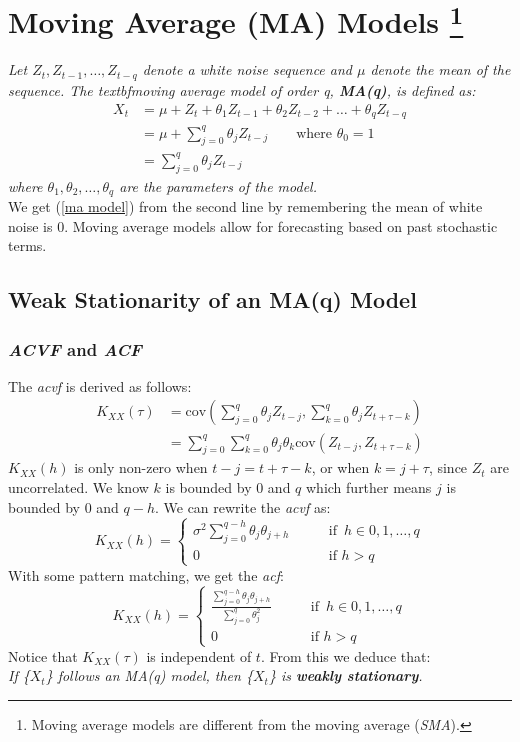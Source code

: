 \documentclass{article}
\begin{document}
\section{Moving Average (MA) Models \protect\footnote{Moving average models are different from the moving average (\emph{SMA}).}}
\textit{Let $Z_t, Z_{t-1}, \ldots, Z_{t-q}$ denote a white noise sequence and $\mu$ denote the mean of the sequence. The textbf{moving average model} of order q, \textbf{MA(q)}, is defined as:
\begin{align}\label{ma model}
    X_t &= \mu + Z_t + \theta_1 Z_{t-1} + \theta_2 Z_{t-2} + \ldots + \theta_q Z_{t-q}\nonumber\\
    &= \mu + \sum_{j=0}^q \theta_j Z_{t-j} \qquad \text{where } \theta_0=1\nonumber\\
    &=  \sum_{j=0}^q \theta_j Z_{t-j}
\end{align}
where $\theta_1, \theta_{2}, \ldots, \theta_{q}$ are the parameters of the model.\\
}
We get (\ref{ma model}) from the second line by remembering the mean of white noise is 0. Moving average models allow for forecasting based on past stochastic terms.
\subsection{Weak Stationarity of an MA(q) Model}
\subsubsection{\emph{ACVF} and \emph{ACF}}
The \emph{acvf} is derived as follows:
\begin{align}\label{ma acvf}
    K_{XX}(\tau) &= \text{cov}(\sum_{j=0}^q \theta_j Z_{t-j}, \sum_{k=0}^q \theta_j Z_{t+\tau-k})\nonumber\\
    &= \sum_{j=0}^q \sum_{k=0}^q \theta_j \theta_k \text{cov}(Z_{t-j}, Z_{t+\tau-k})\nonumber
\end{align}
$K_{XX}(h)$ is only non-zero when $t-j=t+\tau-k$, or when $k=j+\tau$, since $Z_t$ are uncorrelated. We know $k$ is bounded by 0 and $q$ which further means $j$ is bounded by 0 and $q-h$. We can rewrite the \emph{acvf} as:
\begin{equation}\label{ma acvf final}
    K_{XX}(h)=\begin{cases}
        \sigma^2\sum_{j=0}^{q-h} \theta_j \theta_{j+h} \qquad &\text{if } \, h \in 0, 1, \ldots, q\\
        0 \qquad &\text{if } h > q
    \end{cases}
\end{equation}
With some pattern matching, we get the \emph{acf}:
\begin{equation}\label{ma acf}
    K_{XX}(h)=\begin{cases}
        \frac{\sum_{j=0}^{q-h} \theta_j \theta_{j+h}}{\sum_{j=0}^q \theta_j^2} \qquad &\text{if } \, h \in 0, 1, \ldots, q\\
        0 \qquad &\text{if } h > q
    \end{cases}
\end{equation}
Notice that $K_{XX}(\tau)$ is independent of $t$. From this we deduce that:\\
\textit{If \{$X_t$\} follows an MA(q) model, then \{$X_t$\} is \textbf{weakly stationary}.}
\end{document}

